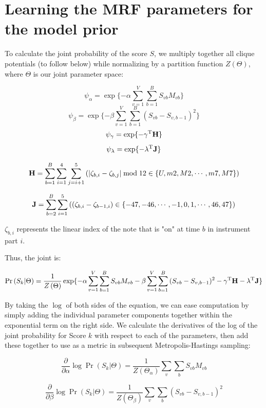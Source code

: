 \documentclass{article}
\begin{document}
\section{Learning the MRF parameters for the model prior}

To calculate the joint probability of the score $S$, we multiply together all clique potentials (to follow below) while normalizing by a partition function $Z\left(\Theta\right)$, where $\Theta$ is our joint parameter space:

\[\psi_\alpha = \exp\{-\alpha\sum_{v=1}^V\sum_{b=1}^B{S_{vb}M_{vb}}\}\]
\[\psi_\beta = \exp\{-\beta\sum_{v=1}^V\sum_{b=1}^B{(S_{vb}-S_{v,b-1})^2}\}\]
\[\psi_\gamma = \exp\{-\gamma^\mathrm{T}{\bf H}\}\]
\[\psi_{\bf \lambda} = \exp\{-\lambda^\mathrm{T}{\bf J}\}\]

\[{\bf H} = \sum_{b=1}^B\sum_{i=1}^4\sum_{j=i+1}^5\left(\left|\zeta_{b,i}-\zeta_{b,j}\right|\bmod{12}\in\{U,m2,M2,\cdots,m7,M7\}\right)\]

\[{\bf J} = \sum_{b=2}^B\sum_{i=1}^5\left(\left(\zeta_{b,i}-\zeta_{b-1,i}\right)\in\{-47,-46,\cdots,-1,0,1,\cdots,46,47\}\right)\]

$\zeta_{b,i}$ represents the linear index of the note that is "on" at time $b$ in instrument part $i$.

Thus, the joint is:

\[\Pr\left(S_k|\Theta\right) = \frac{1}{Z\left(\Theta\right)}\exp\{-\alpha\sum_{v=1}^V\sum_{b=1}^B{S_{vb}M_{vb}}- \beta\sum_{v=1}^V\sum_{b=1}^B{(S_{vb}-S_{v,b-1})^2} - \gamma^\mathrm{T}{\bf H} - \lambda^\mathrm{T}{\bf J}\}\]

By taking the $\log$ of both sides of the equation, we can ease computation by simply adding the individual parameter components together within the exponential term on the right side.  We calculate the derivatives of the log of the joint probability for Score $k$ with respect to each of the parameters, then add these together to use as a metric in subsequent Metropolis-Hastings sampling:


\[\frac{\partial}{\partial\alpha}\log{\Pr\left(S_k|\Theta\right)} = \frac{1}{Z\left(\Theta_\alpha\right)}\sum_v\sum_b{S_{vb}M_{vb}}\]

\[\frac{\partial}{\partial\beta}\log{\Pr\left(S_k|\Theta\right)} = \frac{1}{Z\left(\Theta_\beta\right)}\sum_v\sum_b{(S_{vb}-S_{v,b-1})^2}\]
\end{document}
